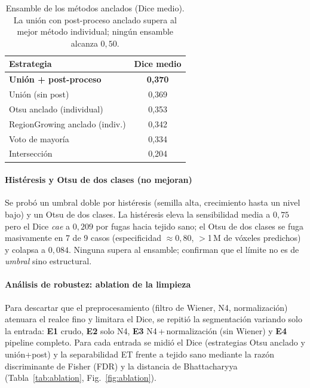 \documentclass[conference]{IEEEtran}
\begin{document}
\begin{table}[h]
\centering
\caption{Ensamble de los métodos anclados (Dice medio). La unión con post-proceso anclado
supera al mejor método individual; ningún ensamble alcanza $0{,}50$.}
\label{tab:ensamble}
\begin{tabular}{lc}
\toprule
Estrategia & Dice medio \\
\midrule
\textbf{Unión + post-proceso} & \textbf{0,370} \\
Unión (sin post)             & 0,369 \\
Otsu anclado (individual)    & 0,353 \\
RegionGrowing anclado (indiv.) & 0,342 \\
Voto de mayoría              & 0,334 \\
Intersección                 & 0,204 \\
\bottomrule
\end{tabular}
\end{table}

\paragraph{Histéresis y Otsu de dos clases (no mejoran)} Se probó un umbral doble por
histéresis (semilla alta, crecimiento hasta un nivel bajo) y un Otsu de dos clases. La
histéresis eleva la sensibilidad media a $0{,}75$ pero el Dice \emph{cae} a $0{,}209$ por
fugas hacia tejido sano; el Otsu de dos clases se fuga masivamente en 7 de 9 casos
(especificidad $\approx0{,}80$, $>$1\,M de vóxeles predichos) y colapsa a $0{,}084$.
Ninguna supera al ensamble; confirman que el límite no es de \emph{umbral} sino estructural.

\paragraph{Análisis de robustez: ablation de la limpieza} Para descartar que el
preprocesamiento (filtro de Wiener, N4, normalización) atenuara el realce fino y limitara
el Dice, se repitió la segmentación variando solo la entrada: \textbf{E1} crudo,
\textbf{E2} solo N4, \textbf{E3} N4\,+\,normalización (sin Wiener) y \textbf{E4} pipeline
completo. Para cada entrada se midió el Dice (estrategias Otsu anclado y unión+post) y la
separabilidad ET frente a tejido sano mediante la razón discriminante de Fisher (FDR) y la
distancia de Bhattacharyya (Tabla~\ref{tab:ablation}, Fig.~\ref{fig:ablation}).
\end{document}
